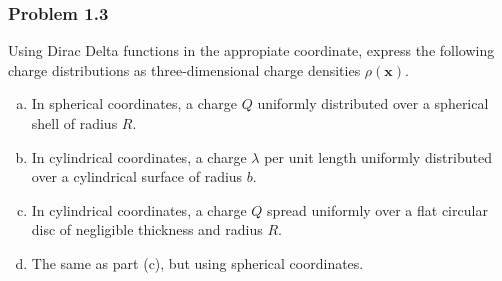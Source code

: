 \subsubsection{Problem 1.3}

Using Dirac Delta functions in the appropiate coordinate, express the following charge distributions as three-dimensional
charge densities $\rho(\mathbf{x})$.

\begin{enumerate}[(a)]
\item In spherical coordinates, a charge $Q$ uniformly distributed over a spherical shell of radius $R$.

\item In cylindrical coordinates, a charge $\lambda$ per unit length uniformly distributed over a cylindrical
surface of radius $b$.

\item In cylindrical coordinates, a charge $Q$ spread uniformly over a flat circular disc of negligible thickness and radius $R$.

\item The same as part (c), but using spherical coordinates.
\end{enumerate}